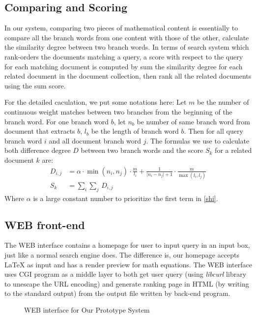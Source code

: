 \documentclass{acm_proc_article-sp}
\begin{document}
\subsection{Comparing and Scoring}
In our system, comparing two pieces of mathematical content is essentially to compare all the branch words from one content with those of the other, calculate the similarity degree between two branch words. In terms of search system which rank-orders the documents matching a query, a score with respect to the query for each matching document is computed by sum the similarity degree for each related document in the document collection, then rank all the related documents using the sum score.

For the detailed caculation, we put some notations here: Let $m$ be the number of continuous weight matches between two branches from the beginning of the branch word. For one branch word $b$, let $n_b$ be number of same branch word from document that extracts $b$, $l_b$ be the length of branch word $b$. Then for all query branch word $i$ and all document branch word $j$. The formulas we use to calculate both difference degree $D$ between two branch words and the score $S_k$ for a related document $k$ are:
\begin{align}
\label{shi}
D_{i,j} &= \alpha \cdot \min(n_i, n_j) \cdot \frac{m}{l_i} + \frac{1}{\lvert n_i - n_j \rvert + 1} \cdot \frac{m}{\max(l_i, l_j)} \\
S_k &= \sum_{i}\sum_{j}\,D_{i,j}
\end{align}
Where $\alpha$ is a large constant number to prioritize the first term in \eqref{shi}.

\subsection{WEB front-end}
The WEB interface contains a homepage for user to input query in an input box, just like a normal search engine does. The difference is, our homepage accepts \LaTeX{} as input and has a render preview for math equations. The WEB interface uses CGI program as a middle layer to both get user query (using \textit{libcurl} library to unescape the URL encoding) and generate ranking page in HTML (by writing to the standard output) from the output file written by back-end program.

\begin{figure*}
\centering
{}
\caption{WEB interface for Our Prototype System}
\end{figure*}
\end{document}
